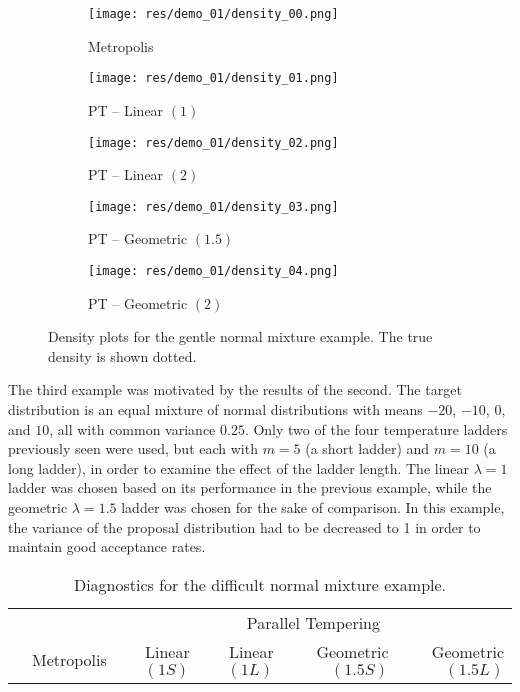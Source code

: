     \begin{figure}[h]
    \begin{subfigure}[b]{0.3\textwidth}
        \texttt{[image: res/demo\_01/density\_00.png]}
        \caption{Metropolis}
    \end{subfigure}
    \begin{subfigure}[b]{0.3\textwidth}
        \texttt{[image: res/demo\_01/density\_01.png]}
        \caption{PT -- Linear $(1)$}
    \end{subfigure}
    \begin{subfigure}[b]{0.3\textwidth}
        \texttt{[image: res/demo\_01/density\_02.png]}
        \caption{PT -- Linear $(2)$}
    \end{subfigure}
    \begin{subfigure}[b]{0.3\textwidth}
        \texttt{[image: res/demo\_01/density\_03.png]}
        \caption{PT -- Geometric $(1.5)$}
    \end{subfigure}
    \begin{subfigure}[b]{0.3\textwidth}
        \texttt{[image: res/demo\_01/density\_04.png]}
        \caption{PT -- Geometric $(2)$}
    \end{subfigure}
    \caption{
    Density plots for the gentle normal mixture example.
    The true density is shown dotted.
    }
    \label{fig:01_density}
    \end{figure}

The third example was motivated by the results of the second.
The target distribution is an equal mixture of normal distributions with means
$-20$, $-10$, $0$, and $10$, all with common variance $0.25$.
Only two of the four temperature ladders previously seen were used,
but each with $m = 5$ (a short ladder) and $m = 10$ (a long ladder),
in order to examine the effect of the ladder length.
The linear $\lambda = 1$ ladder was chosen based on its performance in the
previous example, while the geometric $\lambda = 1.5$ ladder was chosen for
the sake of comparison.
In this example, the variance of the proposal distribution had to be decreased
to 1 in order to maintain good acceptance rates.
    
    \begin{table}[h]
    \begin{tabular}{lrrrrr}
    \toprule
    & & \multicolumn{4}{c}{Parallel Tempering} \\
    \cmidrule(l){3-6}
    & Metropolis & Linear $(1S)$ & Linear $(1L)$ 
    & Geometric $(1.5S)$ & Geometric $(1.5L)$ \\
    \midrule
    
    \bottomrule
    \end{tabular}
    \caption{
    Diagnostics for the difficult normal mixture example.
    }
    \label{tab:02_diag}
    \end{table}

